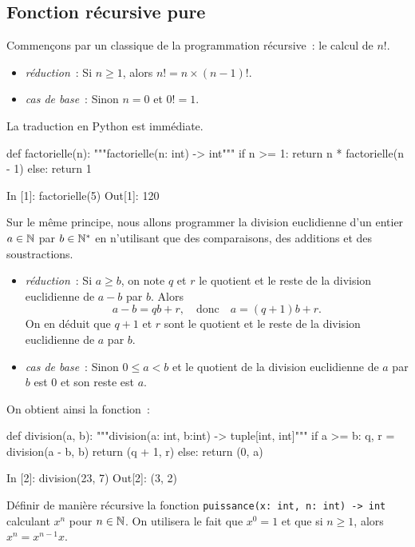 \documentclass{magnoliaold}
\begin{document}
\subsection{Fonction récursive pure}

Commençons par un classique de la programmation récursive~: le calcul de $n!$.
\begin{itemize}
\item \emph{réduction}~: Si $n\geq 1$, alors $n! = n \times (n-1)!$.
\item \emph{cas de base}~: Sinon $n=0$ et $0!=1$.
\end{itemize}
La traduction en Python est immédiate.
\begin{pythoncodeline}
def factorielle(n):
    """factorielle(n: int) -> int"""
    if n >= 1:
        return n * factorielle(n - 1)
    else:
        return 1
\end{pythoncodeline}
\begin{pythoncode}
In [1]: factorielle(5)
Out[1]: 120
\end{pythoncode}

\vspace{2ex}
Sur le même principe, nous allons programmer la division euclidienne d'un entier
$a\in\mathbb{N}$ par $b\in{\mathbb{N}^*}$ en n'utilisant que des comparaisons, des additions et des
soustractions.
\begin{itemize}
\item \emph{réduction}~: Si $a\geq b$, on note $q$ et $r$
  le quotient et le reste de la division euclidienne de $a-b$ par $b$. Alors
  \[a-b=qb+r, \quad\text{donc}\quad a = (q+1)b+r.\]
  On en déduit que $q+1$ et $r$ sont le quotient et le reste de la division euclidienne de $a$
  par $b$.
\item \emph{cas de base}~: Sinon $0\leq a < b$ et le quotient de la division euclidienne
  de $a$ par $b$ est 0 et son reste est $a$.
\end{itemize}
On obtient ainsi la fonction~:
\begin{pythoncodeline}
def division(a, b):
    """division(a: int, b:int) -> tuple[int, int]"""
    if a >= b:
        q, r = division(a - b, b)
        return (q + 1, r)
    else:
        return (0, a)
\end{pythoncodeline}
\begin{pythoncode}
In [2]: division(23, 7)
Out[2]: (3, 2)
\end{pythoncode}

\begin{exoUnique}
\exo Définir de manière récursive la fonction \verb!puissance(x: int, n: int) -> int!
  calculant $x^n$ pour $n\in\mathbb{N}$. On utilisera le fait que $x^0=1$ et que si $n\geq 1$,
  alors $x^n= x^{n-1} x$.
\end{exoUnique}
\end{document}
